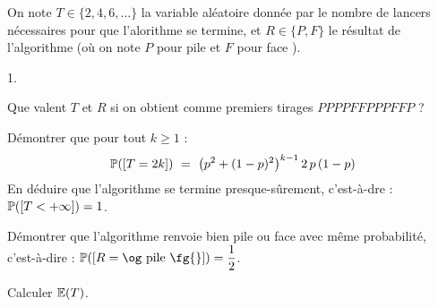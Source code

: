 \documentclass[11pt]{article}%
\begin{document}
\noindent
On note $T \in \{2,4,6, \ldots\}$ la variable aléatoire donnée par le 
nombre de lancers nécessaires pour que l'alorithme se termine, et $R\in 
\{P,F\}$ le résultat de l'algorithme (où on note $P$ pour \og pile 
\fg{} et $F$ pour \og face \fg{}).
\begin{noliste}{1.}
 \item Que valent $T$ et $R$ si on obtient comme premiers tirages 
 $PPPPFFPPPFFP$ ?
 
 \item Démontrer que pour tout $k \geq 1$ :
 \[
  \Prob(\Ev{T=2k}) \ = \ 
  \big(p^2 + (1-p)^2\big)^{k-1} \, 2 \, p \, (1-p)
 \]
 En déduire que l'algorithme se termine presque-sûrement, c'est-à-dre : 
 $\mathbb{P}(\left[ {T < +\infty} \right]) = 1$.
 
 \item Démontrer que l'algorithme renvoie bien \og pile \fg{} ou \og 
 face \fg{} avec même probabilité, c'est-à-dire : $\Prob(\Ev{R=
 \text{\og pile \fg{}}})=\dfrac{1}{2}$.
 
 \item Calculer $\mathbb{E}(T)$.
\end{noliste}
\end{document}
